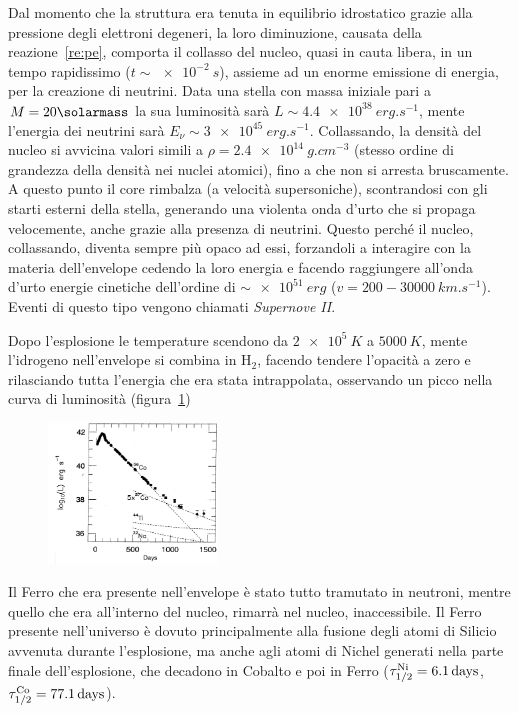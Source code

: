 Dal momento che la struttura era tenuta in equilibrio idrostatico grazie alla pressione degli elettroni degeneri, la loro diminuzione, causata della reazione~\ref{re:pe}, comporta il collasso del nucleo, quasi in cauta libera, in un tempo rapidissimo ($t \sim \SI{e-2}{s}$), assieme ad un enorme emissione di energia, per la creazione di neutrini. Data una stella con massa iniziale pari a $M = 20\si{\solarmass}$ la sua luminosità sarà $L \sim \SI{4.4e38}{erg.s^{-1}}$, mente l'energia dei neutrini sarà $E_\nu \sim \SI{3e45}{erg.s^{-1}}$. Collassando, la densità del nucleo si avvicina valori simili a $\rho = \SI{2.4e14}{g.cm^{-3}}$ (stesso ordine di grandezza della densità nei nuclei atomici), fino a che non si arresta bruscamente. A questo punto il core rimbalza (a velocità supersoniche), scontrandosi con gli starti esterni della stella, generando una violenta onda d'urto che si propaga velocemente, anche grazie alla presenza di neutrini. Questo perché il nucleo, collassando, diventa sempre più opaco ad essi, forzandoli a interagire con la materia dell'envelope cedendo la loro energia e facendo raggiungere all'onda d'urto energie cinetiche dell'ordine di $\sim \SI{e51}{erg}$ ($v = 200-\SI{30000}{km.s^{-1}}$). Eventi di questo tipo vengono chiamati \textit{Supernove II}.

Dopo l'esplosione le temperature scendono da $\SI{2e5}{K}$ a $\SI{5000}{K}$, mente l'idrogeno nell'envelope si combina in $\mbox{H}_2$, facendo tendere l'opacità a zero e rilasciando tutta l'energia che era stata intrappolata, osservando un picco nella curva di luminosità (figura~\ref{fig:supernova})
\begin{figure}
    \centering
    \includegraphics[width = 0.4\textwidth]{immagini/supernova.png}
    \caption{}\label{fig:supernova}
\end{figure}

Il Ferro che era presente nell'envelope è stato tutto tramutato in neutroni, mentre quello che era all'interno del nucleo, rimarrà nel nucleo, inaccessibile. Il Ferro presente nell'universo è dovuto principalmente alla fusione degli atomi di Silicio avvenuta durante l'esplosione, ma anche agli atomi di Nichel generati nella parte finale dell'esplosione, che decadono in Cobalto e poi in Ferro ($\tau_{1/2}^{\mbox{\scriptsize{Ni}}} = \SI{6.1}{days}$, $\tau_{1/2}^{\mbox{\scriptsize{Co}}} = \SI{77.1}{days}$).
